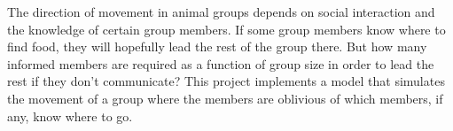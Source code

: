 The direction of movement in animal groups depends on social interaction and the knowledge of certain group members. If some group members know where to find food, they will hopefully lead the rest of the group there. But how many informed members are required as a function of group size in order to lead the rest if they don't communicate? This project implements a model that simulates the movement of a group where the members are oblivious of which members, if any, know where to go.